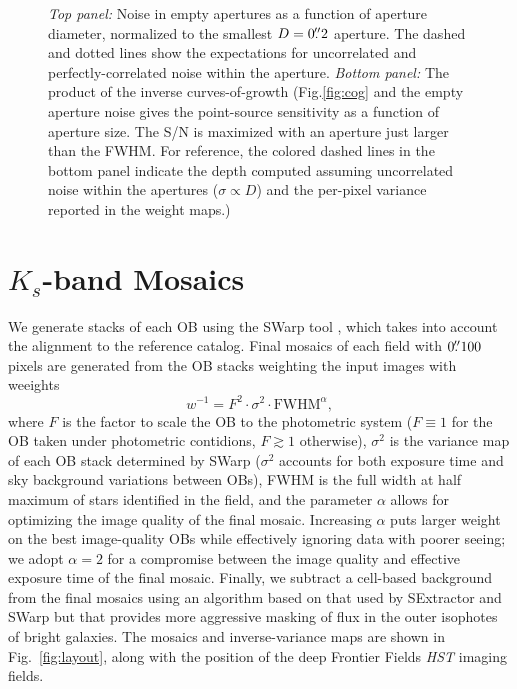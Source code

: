 \documentclass[iop, numberedappendix]{emulateapj}
\begin{document}
\begin{figure}[!ht]
\caption{\textit{Top panel:} Noise in empty apertures as a function of aperture diameter, normalized to the smallest $D=0\mbox{$.\!\!^{\prime\prime}$}2$ aperture.  The dashed and dotted lines show the expectations for uncorrelated and perfectly-correlated noise within the aperture.  \textit{Bottom panel:} The product of the inverse curves-of-growth (Fig.\ref{fig:cog} and the empty aperture noise gives the point-source sensitivity as a function of aperture size.  The S/N is maximized with an aperture just larger than the FWHM.  For reference, the colored dashed lines in the bottom panel indicate the depth computed assuming uncorrelated noise within the apertures ($\sigma \propto D$) and the per-pixel variance reported in the weight maps.)
\label{fig:depth}}  
\end{figure}


\section{$K_s$-band Mosaics}
\label{s:mosaic}

We generate stacks of each OB using the SWarp tool \citep{swarp}, which takes into account the alignment to the reference catalog.  Final mosaics of each field with $0\mbox{$.\!\!^{\prime\prime}$}100$ pixels are generated from the OB stacks weighting the input images with weeights
\[
w^{-1} = F^2\cdot\sigma^2 \cdot \mathrm{FWHM}^\alpha, 
\]
where $F$ is the factor to scale the OB to the photometric system ($F\equiv1$ for the OB taken under photometric contidions, $F\gtrsim1$ otherwise), $\sigma^2$ is the variance map of each OB stack determined by SWarp ($\sigma^2$ accounts for both exposure time and sky background variations between OBs), FWHM is the full width at half maximum of stars identified in the field, and the parameter $\alpha$ allows for optimizing the image quality of the final mosaic.  Increasing $\alpha$ puts larger weight on the best image-quality OBs while effectively ignoring data with poorer seeing; we adopt $\alpha=2$ for a compromise between the image quality and effective exposure time of the final mosaic.  Finally, we subtract a cell-based background from the final mosaics using an algorithm based on that used by SExtractor and SWarp but that provides more aggressive masking of flux in the outer isophotes of bright galaxies. The mosaics and inverse-variance maps are shown in Fig.~\ref{fig:layout}, along with the position of the deep Frontier Fields \textit{HST} imaging fields.
\end{document}
